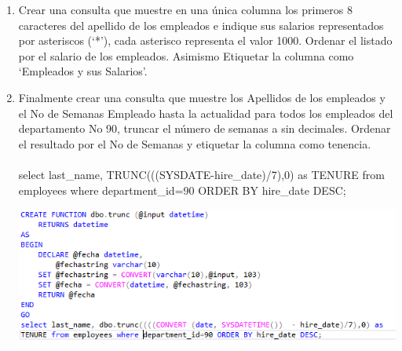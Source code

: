 \begin{enumerate}[1.]
	\item Crear una consulta que muestre en una única columna los primeros 8 caracteres del apellido de los empleados e indique sus salarios representados por asteriscos (‘*’), cada asterisco representa el valor 1000. Ordenar el listado por el salario de los empleados. Asimismo Etiquetar la columna como ‘Empleados y sus Salarios’.
	\item Finalmente crear una consulta que muestre los Apellidos de los empleados y el No de Semanas Empleado hasta la actualidad para todos los empleados del departamento No 90, truncar el número de semanas a sin decimales. Ordenar el resultado por el No de Semanas y etiquetar la columna como tenencia.
	\\
	\\select last\_name, TRUNC(((SYSDATE-hire\_date)/7),0) as TENURE from employees where department\_id=90 ORDER BY hire\_date DESC;
	\begin{center}
		\includegraphics[width=15cm]{./Imagenes/actividad_05_08}
	\end{center}
\end{enumerate}

